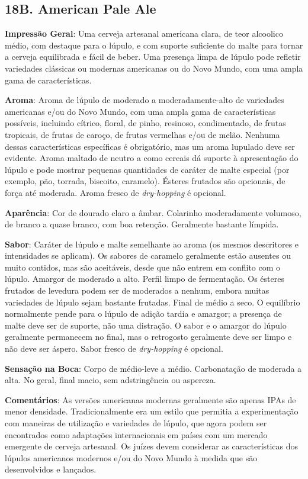 \subsection*{18B. American Pale Ale}
\textbf{Impressão Geral}: Uma cerveja artesanal americana clara, de teor alcoolico médio, com destaque para o lúpulo, e com suporte suficiente do malte para tornar a cerveja equilibrada e fácil de beber. Uma presença limpa de lúpulo pode refletir variedades clássicas ou modernas americanas ou do Novo Mundo, com uma ampla gama de características.

\textbf{Aroma}: Aroma de lúpulo de moderado a moderadamente-alto de variedades americanas e/ou do Novo Mundo, com uma ampla gama de características possíveis, incluindo cítrico, floral, de pinho, resinoso, condimentado, de frutas tropicais, de frutas de caroço, de frutas vermelhas e/ou de melão. Nenhuma dessas características específicas é obrigatório, mas um aroma lupulado deve ser evidente. Aroma maltado de neutro a como cereais dá suporte à apresentação do lúpulo e pode mostrar pequenas quantidades de caráter de malte especial (por exemplo, pão, torrada, biscoito, caramelo). Ésteres frutados são opcionais, de força até moderada. Aroma fresco de \textit{dry-hopping} é opcional.

\textbf{Aparência}: Cor de dourado claro a âmbar. Colarinho moderadamente volumoso, de branco a quase branco, com boa retenção. Geralmente bastante límpida.

\textbf{Sabor}: Caráter de lúpulo e malte semelhante ao aroma (os mesmos descritores e intensidades se aplicam). Os sabores de caramelo geralmente estão ausentes ou muito contidos, mas são aceitáveis, desde que não entrem em conflito com o lúpulo. Amargor de moderado a alto. Perfil limpo de fermentação. Os ésteres frutados de levedura podem ser de moderados a nenhum, embora muitas variedades de lúpulo sejam bastante frutadas. Final de médio a seco. O equilíbrio normalmente pende para o lúpulo de adição tardia e amargor; a presença de malte deve ser de suporte, não uma distração. O sabor e o amargor do lúpulo geralmente permanecem no final, mas o retrogosto geralmente deve ser limpo e não deve ser áspero. Sabor fresco de \textit{dry-hopping} é opcional.

\textbf{Sensação na Boca}: Corpo de médio-leve a médio. Carbonatação de moderada a alta. No geral, final macio, sem adstringência ou aspereza.

\textbf{Comentários}: As versões americanas modernas geralmente são apenas IPAs de menor densidade. Tradicionalmente era um estilo que permitia a experimentação com maneiras de utilização e variedades de lúpulo, que agora podem ser encontrados como adaptações internacionais em países com um mercado emergente de cerveja artesanal. Os juízes devem considerar as características dos lúpulos americanos modernos e/ou do Novo Mundo à medida que são desenvolvidos e lançados.

